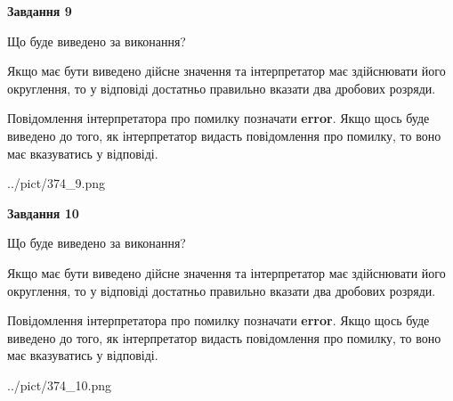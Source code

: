 \documentclass[12pt, ukrainian]{article}
\begin{document}
{\begin {Large}
{\begin {center}\textbf{Завдання 9}\end {center}}\par
Що буде виведено за виконання? \par

Якщо має бути виведено дійсне значення та інтерпретатор має здійснювати його округлення, 
то у відповіді достатньо правильно вказати два дробових розряди.

Повідомлення інтерпретатора про помилку позначати \textbf{error}.
Якщо щось буде виведено до того, як інтерпретатор видасть повідомлення про помилку, 
то воно має вказуватись у відповіді. \par

\begin{center}
	{../pict/374_9.png}
\end{center}
\newpage

{\begin {center}\textbf{Завдання 10}\end {center}}\par
Що буде виведено за виконання? \par

Якщо має бути виведено дійсне значення та інтерпретатор має здійснювати його округлення, 
то у відповіді достатньо правильно вказати два дробових розряди.

Повідомлення інтерпретатора про помилку позначати \textbf{error}.
Якщо щось буде виведено до того, як інтерпретатор видасть повідомлення про помилку, 
то воно має вказуватись у відповіді. \par

\begin{center}
	{../pict/374_10.png}
\end{center}
\newpage

\end {Large}}
\end{document}

